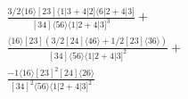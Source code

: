 \documentclass[varwidth, border=5pt]{standalone}
\begin{document}
\begin{my}
$\begin{gathered}
\scriptscriptstyle\frac{3/2⟨16⟩[23]⟨1|3+4|2]⟨6|2+4|3]}{[34]⟨56⟩⟨1|2+4|3]^3}+\\
\scriptscriptstyle\frac{⟨16⟩[23](3/2[24]⟨46⟩+1/2[23]⟨36⟩)}{[34]⟨56⟩⟨1|2+4|3]^2}+\\
\scriptscriptstyle\frac{-1⟨16⟩[23]^2[24]⟨26⟩}{[34]^2⟨56⟩⟨1|2+4|3]^2}\phantom{+}
\end{gathered}$
\end{my}
\end{document}
